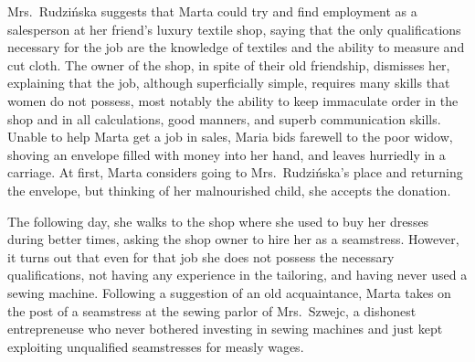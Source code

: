 Mrs.\ Rudzińska suggests that Marta could try and find employment as a salesperson at her friend's luxury textile shop, saying that the only qualifications necessary for the job are the knowledge of textiles and the ability to measure and cut cloth.
The owner of the shop, in spite of their old friendship, dismisses her, explaining that the job, although superficially simple, requires many skills that women do not possess, most notably the ability to keep immaculate order in the shop and in all calculations, good manners, and superb communication skills.
Unable to help Marta get a job in sales, Maria bids farewell to the poor widow, shoving an envelope filled with money into her hand, and leaves hurriedly in a carriage.
At first, Marta considers going to Mrs.\ Rudzińska's place and returning the envelope, but thinking of her malnourished child, she accepts the donation.

The following day, she walks to the shop where she used to buy her dresses during better times, asking the shop owner to hire her as a seamstress.
However, it turns out that even for that job she does not possess the necessary qualifications, not having any experience in the tailoring, and having never used a sewing machine.
Following a suggestion of an old acquaintance, Marta takes on the post of a seamstress at the sewing parlor of Mrs.\ Szwejc, a dishonest entrepreneuse who never bothered investing in sewing machines and just kept exploiting unqualified seamstresses for measly wages.

